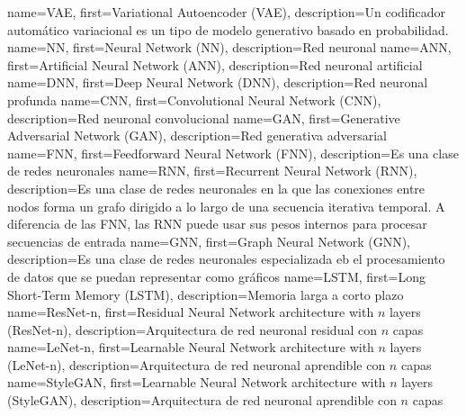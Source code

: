       {name={VAE},        first={Variational Autoencoder (VAE)},                                      description={Un codificador automático variacional es un tipo de modelo generativo basado en probabilidad.}}
       {name={NN},         first={Neural Network (NN)},                                                description={Red neuronal}}
      {name={ANN},        first={Artificial Neural Network (ANN)},                                    description={Red neuronal artificial}}
      {name={DNN},        first={Deep Neural Network (DNN)},                                          description={Red neuronal profunda}}
      {name={CNN},        first={Convolutional Neural Network (CNN)},                                 description={Red neuronal convolucional}}
      {name={GAN},        first={Generative Adversarial Network (GAN)},                               description={Red generativa adversarial}}
      {name={FNN},        first={Feedforward Neural Network (FNN)},                                   description={Es una clase de redes neuronales}}
      {name={RNN},        first={Recurrent Neural Network (RNN)},                                     description={Es una clase de redes neuronales en la que las conexiones entre nodos forma un grafo dirigido a lo largo de una secuencia iterativa temporal. A diferencia de las FNN, las RNN puede usar sus pesos internos para procesar secuencias de entrada}}
      {name={GNN},        first={Graph Neural Network (GNN)},                                         description={Es una clase de redes neuronales especializada eb el procesamiento de datos que se puedan representar como gráficos}}
     {name={LSTM},       first={Long Short-Term Memory (LSTM)},                                      description={Memoria larga a corto plazo}}
 {name={ResNet-n},   first={Residual Neural Network architecture with $n$ layers (ResNet-n)},    description={Arquitectura de red neuronal residual con $n$ capas}}
  {name={LeNet-n},    first={Learnable Neural Network architecture with $n$ layers (LeNet-n)},    description={Arquitectura de red neuronal aprendible con $n$ capas}}
 {name={StyleGAN},   first={Learnable Neural Network architecture with $n$ layers (StyleGAN)},   description={Arquitectura de red neuronal aprendible con $n$ capas}}


